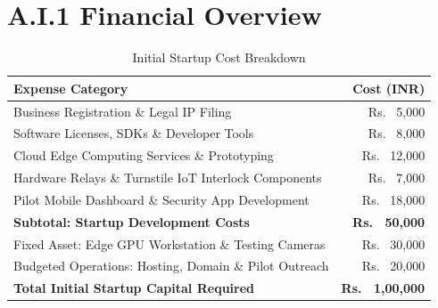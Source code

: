 \documentclass[12pt,a4paper]{report}
\begin{document}
\section*{A.I.1 Financial Overview}
\begin{table}[htbp]
\centering
\caption{Initial Startup Cost Breakdown}
\label{tab:startup_cost}
\begin{tabularx}{0.85\textwidth}{Xr}
\toprule
\textbf{Expense Category} & \textbf{Cost (INR)} \\
\midrule
Business Registration \& Legal IP Filing & Rs.~ 5,000 \\
Software Licenses, SDKs \& Developer Tools & Rs.~ 8,000 \\
Cloud Edge Computing Services \& Prototyping & Rs.~ 12,000 \\
Hardware Relays \& Turnstile IoT Interlock Components & Rs.~ 7,000 \\
Pilot Mobile Dashboard \& Security App Development & Rs.~ 18,000 \\
\midrule
\textbf{Subtotal: Startup Development Costs} & \textbf{Rs.~ 50,000} \\
\midrule
Fixed Asset: Edge GPU Workstation \& Testing Cameras & Rs.~ 30,000 \\
Budgeted Operations: Hosting, Domain \& Pilot Outreach & Rs.~ 20,000 \\
\midrule
\textbf{Total Initial Startup Capital Required} & \textbf{Rs.~ 1,00,000} \\
\bottomrule
\end{tabularx}
\end{table}
\end{document}
